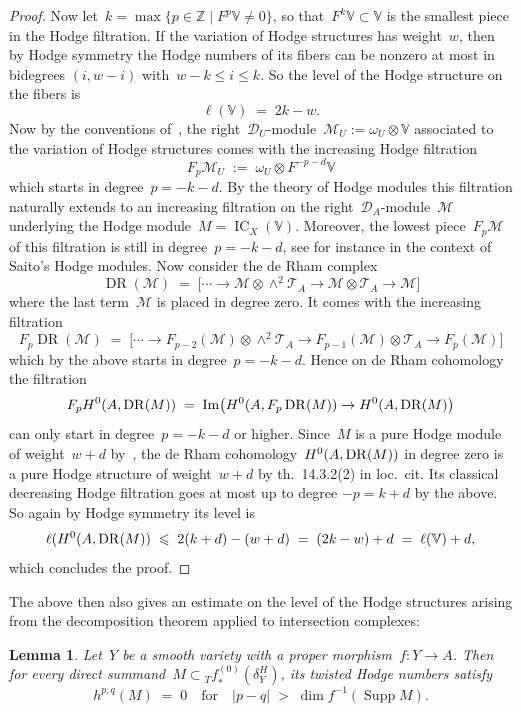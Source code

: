 \documentclass[a4paper]{amsart}
\newcommand{\bbV}{\mathbb{V}}
\newcommand{\bbZ}{\mathbb{Z}}
\newcommand{\cD}{\mathcal{D}}
\newcommand{\cM}{\mathcal{M}}
\newcommand{\cT}{\mathcal{T}}
\newcommand{\rH}{\textup{H}}
\newcommand{\sssT}{\scriptscriptstyle{T}}
\newcommand{\tfstar}{{_{\sssT}f}_*}
\DeclareMathOperator{\im}{Im}
\DeclareMathOperator{\Supp}{Supp}
\DeclareMathOperator{\IC}{IC}
\DeclareMathOperator{\DR}{DR}
\renewcommand{\le}{\leqslant}
\theoremstyle{plain}
\newtheorem{lemma}[theorem]{Lemma}
\theoremstyle{definition}
\numberwithin{equation}{section}
\begin{document}
\begin{proof}
Now let~$k = \max\{ p \in \bbZ \mid F^p \bbV \neq 0 \}$, so that~$F^k \bbV\subset \bbV$ is the smallest piece in the Hodge filtration. If the variation of Hodge structures has weight~$w$, then by Hodge symmetry the Hodge numbers of its fibers can be nonzero at most in bidegrees $(i, w-i)$ with~$w-k \le i \le k$. So the level of the Hodge structure on the fibers is 
%
\[
 \ell(\bbV) \;=\; 2k - w.
\]
%
Now by the conventions of~\cite[appendix~A.7]{MHMProject}, the right~$\cD_U$-module~$\cM_U :=\omega_U\otimes \bbV$ associated to the variation of Hodge structures comes with the increasing Hodge filtration 
%
\[ 
F_p \cM_U \;:=\; \omega_U \otimes F^{-p-d} \bbV 
\]
which starts in degree~$p=-k-d$. By the theory of Hodge modules this filtration naturally extends to an increasing filtration on the right~$\cD_A$-module~$\cM$ underlying the Hodge module~$M=\IC_X(\bbV)$. Moreover, the lowest piece~$F_p \cM$ of this filtration is still in degree~$p=-k-d$, see for instance \cite[sect.~2.4]{SchnellYang} in the context of Saito's Hodge modules. Now consider the de Rham complex
%
\[
 \DR(\cM) 
 \;=\;
 \bigl[
 \cdots 
 \to \cM \otimes \wedge^2 \cT_A 
 \to \cM \otimes \cT_A 
 \to \cM
 \bigr]
\]
%
where the last term~$\cM$ is placed in degree zero. It comes with the increasing filtration
%
\[
 F_p\DR(\cM) 
 \;=\;
 \bigl[
 \cdots 
 \to F_{p-2}(\cM) \otimes \wedge^2 \cT_A 
 \to F_{p-1}(\cM) \otimes \cT_A 
 \to F_p (\cM)
 \bigr]
\]
%
which by the above starts in degree~$p=-k-d$. Hence on de Rham cohomology the filtration
%
\[
 F_p \rH^0(A, \DR(M)) \;=\; \im \bigl( \rH^0(A, F_p \DR(M)) \to \rH^0(A, \DR(M) \bigr)
\]
%
can only start in degree~$p=-k-d$ or higher. Since~$M$ is a pure Hodge module of weight~$w+d$ by~\cite[th.~14.6.1]{MHMProject}, the de Rham cohomology~$\rH^0(A, \DR(M))$ in degree zero is a pure Hodge structure of weight~$w+d$ by th.~14.3.2(2) in loc.~cit. Its classical decreasing Hodge filtration goes at most up to degree $-p = k+d$ by the above. So again by Hodge symmetry its level is
%
\[
 \ell(\rH^0(A, \DR(M)) \;\le \; 2(k+d) - (w+d) \;=\; (2k-w) + d \;=\; \ell(\bbV) + d,
\]
%
which concludes the proof.
\end{proof} 

The above then also gives an estimate on the level of the Hodge structures arising from the decomposition theorem applied to intersection complexes:

\begin{lemma} \label{Hodge-level-of-direct-image} 
Let~$Y$ be a smooth variety with a proper morphism~$f\colon Y\to A$. Then for every direct summand~$M\subset \tfstar^{(0)}(\delta_Y^H)$, its twisted Hodge numbers satisfy
%
\[
 h^{p,q}(M) \;=\; 0 \quad \text{for} \quad |p-q| \;>\; \dim f^{-1}(\Supp M).
\]
\end{lemma}
\end{document}
